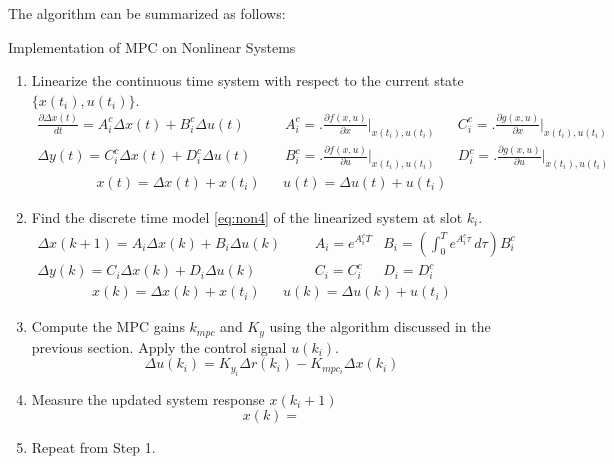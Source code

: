             \clearpage
            The algorithm can be summarized as follows:
            \begin{alg}
                Implementation of MPC on Nonlinear Systems
                \begin{enumerate}
                    \item Linearize the continuous time system with respect to the current state $\{x(t_i), u(t_i)\} $.  
                        $$\begin{matrix}
                            \frac{\partial\Delta x(t)}{dt} = A_i^c \Delta x(t) + B_i^c \Delta u(t) & & &  A_i^c = \biggl.\frac{\partial f(x,u)}{\partial x}\biggr|_{x(t_i), u(t_i)} & & C_i^c = \biggl.\frac{\partial g(x,u)}{\partial x}\biggr|_{x(t_i), u(t_i)}\\
                            \Delta y(t) = C_i^c \Delta x(t) + D_i^c \Delta u(t) & & & B_i^c = \biggl.\frac{\partial f(x,u)}{\partial u}\biggr|_{x(t_i), u(t_i)} & & D_i^c = \biggl.\frac{\partial g(x,u)}{\partial u}\biggr|_{x(t_i), u(t_i)}
                        \end{matrix}$$
                        $$ \begin{matrix} x(t) = \Delta x(t) + x(t_i) & & u(t) = \Delta u(t) + u(t_i) \end{matrix}$$
                    
                    \item Find the discrete time model \eqref{eq:non4} of the linearized system at slot $k_i$.
                        $$\begin{matrix}
                            \Delta x(k+1) = A_i \Delta  x(k) + B_i \Delta  u(k) & & & A_i = e^{A_i^c T} & B_i = \left (  \int_{0}^{T} e^{A_i^c \tau}\, d\tau \right ) B_i^c \\
                            \Delta y(k)   = C_i \Delta x(k) + D_i \Delta u(k)   & & & C_i = C_i^c       & D_i = D_i^c
                        \end{matrix}$$
                        $$ \begin{matrix} x(k) = \Delta x(k) + x(t_i) & & u(k) = \Delta u(k) + u(t_i) \end{matrix}$$
                    \item Compute the MPC gains $k_{mpc}$ and $K_y$ using the algorithm discussed in the previous section.  Apply the control signal $u(k_i)$.
                        $$\Delta u(k_i) = K_{y_i} \Delta r(k_i) - K_{mpc_i} \Delta x(k_i) $$
                    \item Measure the updated system response $x(k_i+1)$
                        $$x(k) = $$
                    \item Repeat from Step 1.
                \end{enumerate}
            \end{alg}

